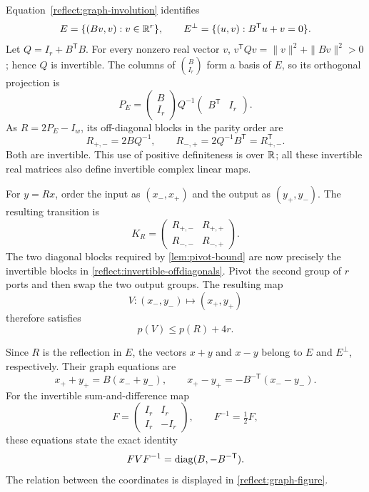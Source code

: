 Equation~\eqref{reflect:graph-involution} identifies
\[
 E=\{(Bv,v):v\in\mathbb R^r\},\qquad
 E^\perp=\{(u,v):B^{\mathsf T}u+v=0\}.
\]
Let $Q=I_r+B^{\mathsf T}B$.  For every nonzero real vector $v$,
$v^{\mathsf T}Qv=\|v\|^2+\|Bv\|^2>0$; hence $Q$ is invertible.
The columns of $\binom{B}{I_r}$ form a basis of $E$, so its
orthogonal projection is
\[
 P_E=\begin{pmatrix}B\\I_r\end{pmatrix}
       Q^{-1}\begin{pmatrix}B^{\mathsf T}&I_r\end{pmatrix}.
\]
As $R=2P_E-I_w$, its off-diagonal blocks in the parity order are
\begin{equation}
 R_{+,-}=2BQ^{-1},\qquad
 R_{-,+}=2Q^{-1}B^{\mathsf T}=R_{+,-}^{\mathsf T}.
 \label{reflect:invertible-offdiagonals}
\end{equation}
Both are invertible.  This use of positive definiteness is over
$\mathbb R$; all these invertible real matrices also define invertible
complex linear maps.

For $y=Rx$, order the input as $(x_-,x_+)$ and the output as
$(y_+,y_-)$.  The resulting transition is
\[
 K_R=\begin{pmatrix}R_{+,-}&R_{+,+}\\
                    R_{-,-}&R_{-,+}\end{pmatrix}.
\]
The two diagonal blocks required by \cref{lem:pivot-bound} are now
precisely the invertible blocks in
\eqref{reflect:invertible-offdiagonals}.
Pivot the second group of $r$ ports and then swap the two output
groups.  The resulting map
\[
 V:(x_-,y_-)\longmapsto(x_+,y_+)
\]
therefore satisfies
\begin{equation}
 p(V)\leq p(R)+4r.
 \label{reflect:graph-pivot-price}
\end{equation}

Since $R$ is the reflection in $E$, the vectors $x+y$ and $x-y$
belong to $E$ and $E^\perp$, respectively.  Their graph equations are
\[
 x_++y_+=B(x_-+y_-),\qquad
 x_+-y_+=-B^{-\mathsf T}(x_--y_-).
\]
For the invertible sum-and-difference map
\[
 F=\begin{pmatrix}I_r&I_r\\I_r&-I_r\end{pmatrix},
 \qquad F^{-1}=\tfrac12F,
\]
these equations state the exact identity
\begin{equation}
 FVF^{-1}=\operatorname{diag}(B,-B^{-\mathsf T}).
 \label{reflect:graph-diagonalization}
\end{equation}
The relation between the coordinates is displayed in
\cref{reflect:graph-figure}.

